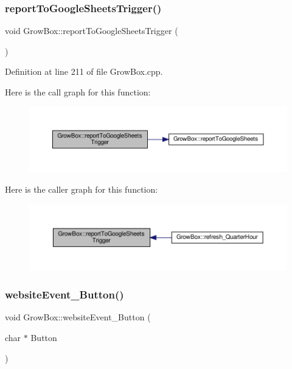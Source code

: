 \subsubsection{\texorpdfstring{report\+To\+Google\+Sheets\+Trigger()}{reportToGoogleSheetsTrigger()}\hspace{0.1cm}{\footnotesize\ttfamily [2/2]}}
{\footnotesize\ttfamily void Grow\+Box\+::report\+To\+Google\+Sheets\+Trigger (\begin{DoxyParamCaption}{ }\end{DoxyParamCaption})}



Definition at line 211 of file Grow\+Box.\+cpp.

Here is the call graph for this function\+:
\nopagebreak
\begin{figure}[H]
\begin{center}
\leavevmode
\includegraphics[width=350pt]{class_grow_box_a45f0e8f17bae077486e5839d621cdf5b_cgraph}
\end{center}
\end{figure}
Here is the caller graph for this function\+:
\nopagebreak
\begin{figure}[H]
\begin{center}
\leavevmode
\includegraphics[width=350pt]{class_grow_box_a45f0e8f17bae077486e5839d621cdf5b_icgraph}
\end{center}
\end{figure}
\mbox{\label{class_grow_box_ad246a22690da3301345b0337aab8258f}} 
\subsubsection{\texorpdfstring{website\+Event\+\_\+\+Button()}{websiteEvent\_Button()}\hspace{0.1cm}{\footnotesize\ttfamily [1/2]}}
{\footnotesize\ttfamily void Grow\+Box\+::website\+Event\+\_\+\+Button (\begin{DoxyParamCaption}\item[{char $\ast$}]{Button }\end{DoxyParamCaption})}

